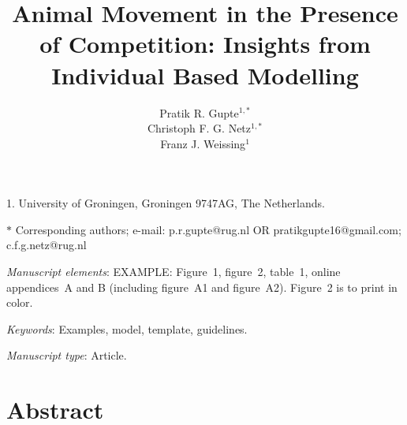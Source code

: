 \documentclass[11pt]{article}
\title{Animal Movement in the Presence of Competition: Insights from Individual Based Modelling}
\author{Pratik R. Gupte$^{1,\ast}$ \\ 
        Christoph F. G. Netz$^{1,\ast}$ \\ 
        Franz J. Weissing$^{1}$}
\date{}
\begin{document}
\maketitle

\noindent{} 1. University of Groningen, Groningen 9747AG, The Netherlands.

\noindent{} $\ast$ Corresponding authors; e-mail: p.r.gupte@rug.nl OR pratikgupte16@gmail.com; c.f.g.netz@rug.nl

\bigskip

\textit{Manuscript elements}: EXAMPLE: Figure~1, figure~2, table~1, online appendices~A and B (including figure~A1 and figure~A2). Figure~2 is to print in color.

\bigskip

\textit{Keywords}: Examples, model, template, guidelines.

\bigskip

\textit{Manuscript type}: Article. %

\bigskip


\linenumbers{}
\modulolinenumbers[1]

\newpage{}

\section{Abstract}
\end{document}
